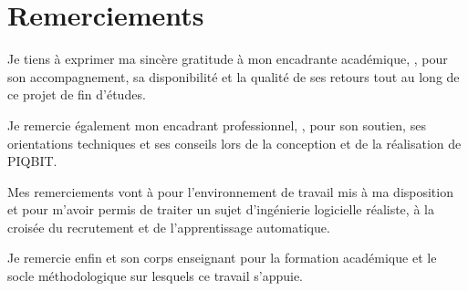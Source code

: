 \chapter*{Remerciements}

Je tiens à exprimer ma sincère gratitude à mon encadrante académique,
\reportAcademicSupervisor, pour son accompagnement, sa disponibilité et la
qualité de ses retours tout au long de ce projet de fin d'études.

Je remercie également mon encadrant professionnel,
\reportProfessionalSupervisor, pour son soutien, ses orientations techniques
et ses conseils lors de la conception et de la réalisation de PIQBIT.

Mes remerciements vont à \reportHostOrg{} pour l'environnement de travail mis
à ma disposition et pour m'avoir permis de traiter un sujet d'ingénierie
logicielle réaliste, à la croisée du recrutement et de l'apprentissage
automatique.

Je remercie enfin \reportInstitution{} et son corps enseignant pour la
formation académique et le socle méthodologique sur lesquels ce travail
s'appuie.
